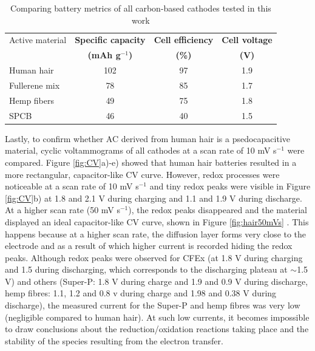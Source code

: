 \documentclass{article}
\begin{document}
\begin{table}
\caption{Comparing battery metrics of all carbon-based cathodes tested in this work} \label{table1}
\begin{center}
\begin{tabular}{|lccc|}
\hline
Active material  & {\textbf{Specific capacity}} & {\textbf{Cell efficiency}} & {\textbf{Cell voltage}}\\
 & {\textbf{(mAh g$^{-1}$)}} & {\textbf{(\%)}} & {\textbf{(V)}}\\
\hline
Human hair &  102 & 97 & 1.9 \\
Fullerene mix &  78 & 85 & 1.7 \\
Hemp fibers & 49 & 75 & 1.8 \\
SPCB & 46 & 40 & 1.5 \\
\hline  
\end{tabular}
\end{center}
\end{table}

Lastly, to confirm whether AC derived from human hair is a psedocapacitive material, cyclic voltammograms of all cathodes at a scan rate of 10 mV s$^{-1}$ were compared. Figure \ref{fig:CV}a)-e) showed that human hair batteries resulted in a more rectangular, capacitor-like CV curve. However, redox processes were noticeable at a scan rate of 10 mV s$^{-1}$ and tiny redox peaks were visible in Figure \ref{fig:CV}b) at 1.8 and 2.1 V during charging and 1.1 and 1.9 V during discharge. At a higher scan rate (50 mV s$^{-1}$), the redox peaks disappeared and the material displayed an ideal capacitor-like CV curve, shown in Figure \ref{fig:hair50mVs} \cite{guan_capacitive_2016, dupont_separating_2015}. This happens because at a higher scan rate, the diffusion layer forms very close to the electrode and as a result of which higher current is recorded hiding the redox peaks. Although redox peaks were observed for CFEx (at 1.8 V during charging and 1.5 during discharging, which corresponds to the discharging plateau at $\sim$1.5 V) and others (Super-P: 1.8 V during charge and 1.9 and 0.9 V during discharge, hemp fibres: 1.1, 1.2 and 0.8 v during charge and 1.98 and 0.38 V during discharge), the measured current for the Super-P and hemp fibres was very low (negligible compared to human hair). At such low currents, it becomes impossible to draw conclusions about the reduction/oxidation reactions taking place and the stability of the species resulting from the electron transfer. 
\end{document}
